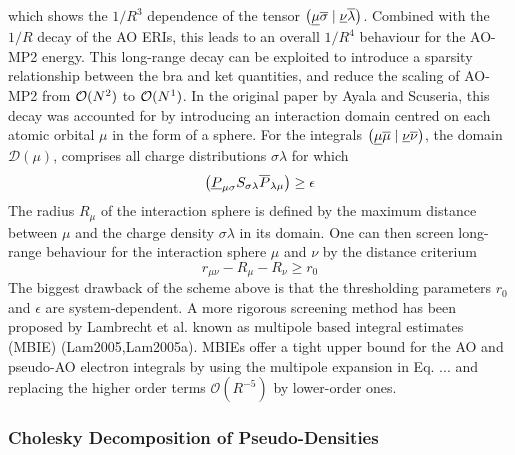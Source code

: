 \noindent which shows the $1/R^3$ dependence of the tensor $\left( \underline{\mu}\overline{\sigma} \mid \underline{\nu}\overline{\lambda} \right)$. Combined with the $1/R$ decay of the AO ERIs, this leads to an overall $1/R^4$ behaviour for the AO-MP2 energy. This long-range decay can be exploited to introduce a sparsity relationship between the bra and ket quantities, and reduce the scaling of AO-MP2 from $\mathcal{O}(N^{2})$ to $\mathcal{O}(N^{1})$. In the original paper by Ayala and Scuseria, this decay was accounted for by introducing an interaction domain centred on each atomic orbital $\mu$ in the form of a sphere. For the integrals $\left( \underline{\mu}\overline{\mu} \mid \underline{\nu}\overline{\nu} \right)$, the domain $\mathcal{D}(\mu)$, comprises all charge distributions $\sigma\lambda$ for which 
\begin{equation}
\left( \underline{P}_{\mu\sigma} S_{\sigma\lambda} \overline{P}_{\lambda\mu} \right) \geq \epsilon 
\end{equation}
\noindent The radius $R_{\mu}$ of the interaction sphere is defined by the maximum distance between $\mu$ and the charge density $\sigma\lambda$ in its domain. One can then screen long-range behaviour for the interaction sphere $\mu$ and $\nu$ by the distance criterium
\begin{equation}
r_{\mu\nu} - R_{\mu} - R_{\nu} \geq r_0
\end{equation}
\noindent The biggest drawback of the scheme above is that the thresholding parameters $r_0$ and $\epsilon$ are system-dependent. 
A more rigorous screening method has been proposed by Lambrecht et al. known as multipole based integral estimates (MBIE) (Lam2005,Lam2005a). MBIEs offer a tight upper bound for the AO and pseudo-AO electron integrals by using the multipole expansion in Eq. ... and replacing the higher order terms $\mathcal{O}(R^{-5})$ by lower-order ones. 


\subsubsection{Cholesky Decomposition of Pseudo-Densities}

